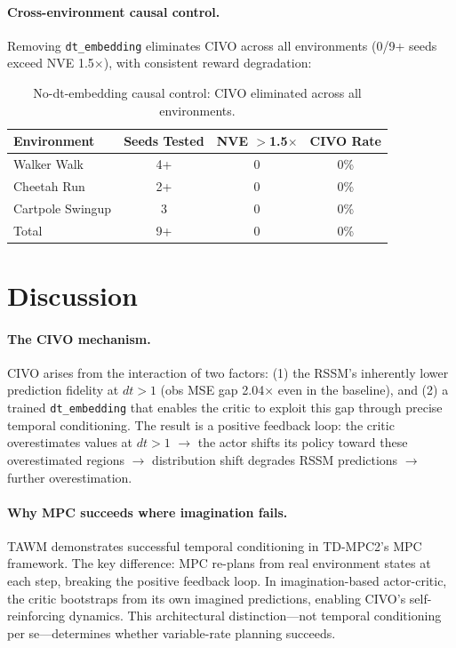 \documentclass[10pt,letterpaper]{article}
\begin{document}
\paragraph{Cross-environment causal control.}
Removing \texttt{dt\_embedding} eliminates CIVO across all environments (0/9+ seeds exceed NVE 1.5$\times$), with consistent reward degradation:

\begin{table}[h]
\centering
\caption{No-dt-embedding causal control: CIVO eliminated across all environments.}
\label{tab:no_emb_cross_env}
\small
\begin{tabular}{@{}lccc@{}}
\toprule
Environment & Seeds Tested & NVE $>$1.5$\times$ & CIVO Rate \\
\midrule
Walker Walk      & 4+ & 0 & 0\% \\
Cheetah Run      & 2+ & 0 & 0\% \\
Cartpole Swingup & 3  & 0 & 0\% \\
\midrule
Total            & 9+ & 0 & 0\% \\
\bottomrule
\end{tabular}
\end{table}

\section{Discussion}

\paragraph{The CIVO mechanism.}
CIVO arises from the interaction of two factors: (1) the RSSM's inherently lower prediction fidelity at $dt>1$ (obs MSE gap 2.04$\times$ even in the baseline), and (2) a trained \texttt{dt\_embedding} that enables the critic to exploit this gap through precise temporal conditioning.
The result is a positive feedback loop: the critic overestimates values at $dt>1$ $\to$ the actor shifts its policy toward these overestimated regions $\to$ distribution shift degrades RSSM predictions $\to$ further overestimation.

\paragraph{Why MPC succeeds where imagination fails.}
TAWM \cite{nhu2025tawm} demonstrates successful temporal conditioning in TD-MPC2's MPC framework.
The key difference: MPC re-plans from real environment states at each step, breaking the positive feedback loop.
In imagination-based actor-critic, the critic bootstraps from its own imagined predictions, enabling CIVO's self-reinforcing dynamics.
This architectural distinction---not temporal conditioning per se---determines whether variable-rate planning succeeds.
\end{document}
